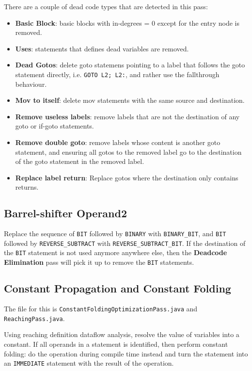 \documentclass[nonacm, acmsmall, screen, 10pt]{acmart}
\begin{document}
There are a couple of dead code types that are detected in this pass:
\begin{itemize}
  \item \textbf{Basic Block}: basic blocks with in-degrees = 0 except for the entry node is removed.
  \item \textbf{Uses}: statements that defines dead variables are removed.
  \item \textbf{Dead Gotos}: delete goto statemens pointing to a label that follows the goto statement directly, i.e. \texttt{GOTO L2; L2:}, and rather use the fallthrough behaviour.
  \item \textbf{Mov to itself}: delete mov statements with the same source and destination.
  \item \textbf{Remove useless labels}: remove labels that are not the destination of any goto or if-goto statements.
  \item \textbf{Remove double goto}: remove labels whose content is another goto statement, and ensuring all gotos to the removed label go to the destination of the goto statement in the removed label.
  \item \textbf{Replace label return}: Replace gotos where the destination only contains returns.
\end{itemize}

\subsection{Barrel-shifter Operand2}
Replace the sequence of \texttt{BIT} followed by \texttt{BINARY} with \texttt{BINARY\_BIT}, and \texttt{BIT} followed by \texttt{REVERSE\_SUBTRACT} with \texttt{REVERSE\_SUBTRACT\_BIT}.
If the destination of the \texttt{BIT} statement is not used anymore anywhere else, then the \textbf{Deadcode Elimination} pass will pick it up to remove the \texttt{BIT} statements.

\subsection{Constant Propagation and Constant Folding}
The file for this is \texttt{ConstantFoldingOptimizationPass.java} and \texttt{ReachingPass.java}.

Using reaching definition dataflow analysis, resolve the value of variables into a constant.
If all operands in a statement is identified, then perform constant folding: do the operation during compile time instead and turn the statement into an \texttt{IMMEDIATE} statement with the result of the operation.
\end{document}
